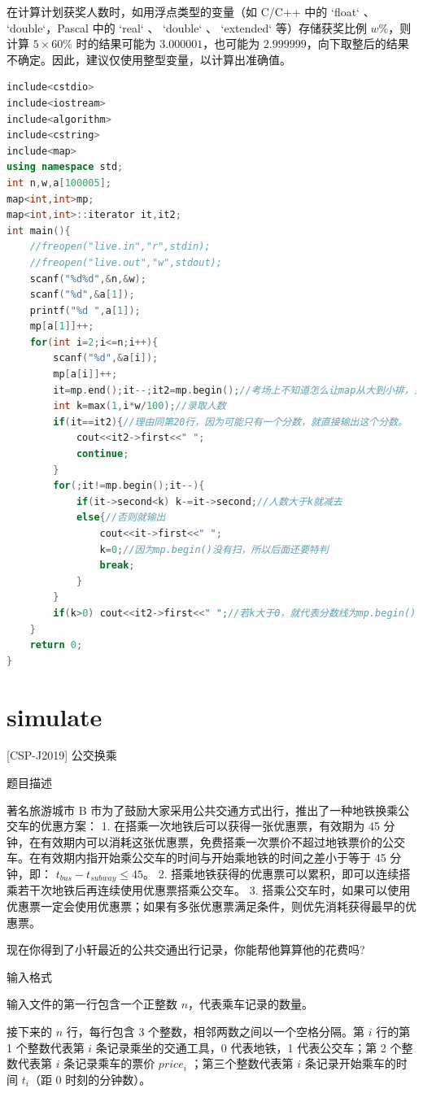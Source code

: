 \documentclass[12pt,twiside,a4paper]{ctexbook}
\numberwithin{chapter}{part}
\begin{document}
在计算计划获奖人数时，如用浮点类型的变量（如 C/C++ 中的 `float` 、 `double`，Pascal 中的 `real` 、 `double` 、 `extended` 等）存储获奖比例 $w\%$，则计算 $5 \times 60\%$ 时的结果可能为 $3.000001$，也可能为 $2.999999$，向下取整后的结果不确定。因此，建议仅使用整型变量，以计算出准确值。
\begin{lstlisting}[language=c++,breaklines=true]
include<cstdio>
include<iostream>
include<algorithm>
include<cstring>
include<map>
using namespace std;
int n,w,a[100005];
map<int,int>mp;
map<int,int>::iterator it,it2;
int main(){
	//freopen("live.in","r",stdin);
	//freopen("live.out","w",stdout);
	scanf("%d%d",&n,&w);
	scanf("%d",&a[1]);
	printf("%d ",a[1]);
	mp[a[1]]++;
	for(int i=2;i<=n;i++){
		scanf("%d",&a[i]);
		mp[a[i]]++;
		it=mp.end();it--;it2=mp.begin();//考场上不知道怎么让map从大到小排，只好麻烦些做了。 
		int k=max(1,i*w/100);//录取人数 
		if(it==it2){//理由同第20行，因为可能只有一个分数，就直接输出这个分数。 
			cout<<it2->first<<" ";
			continue;
		}
		for(;it!=mp.begin();it--){ 
			if(it->second<k) k-=it->second;//人数大于k就减去 
			else{//否则就输出 
				cout<<it->first<<" ";
				k=0;//因为mp.begin()没有扫，所以后面还要特判 
				break;
			}
		}
		if(k>0) cout<<it2->first<<" ";//若k大于0，就代表分数线为mp.begin(),输出 
	}
	return 0;
}
\end{lstlisting}

\chapter{simulate}
 [CSP-J2019] 公交换乘

 题目描述

著名旅游城市 B 市为了鼓励大家采用公共交通方式出行，推出了一种地铁换乘公交车的优惠方案：
1. 在搭乘一次地铁后可以获得一张优惠票，有效期为 45 分钟，在有效期内可以消耗这张优惠票，免费搭乘一次票价不超过地铁票价的公交车。在有效期内指开始乘公交车的时间与开始乘地铁的时间之差小于等于 45 分钟，即：
$t_{bus} - t_{subway} \leq 45$。
2. 搭乘地铁获得的优惠票可以累积，即可以连续搭乘若干次地铁后再连续使用优惠票搭乘公交车。
3. 搭乘公交车时，如果可以使用优惠票一定会使用优惠票；如果有多张优惠票满足条件，则优先消耗获得最早的优惠票。

现在你得到了小轩最近的公共交通出行记录，你能帮他算算他的花费吗?

 输入格式

输入文件的第一行包含一个正整数 $n$，代表乘车记录的数量。

接下来的 $n$ 行，每行包含 3 个整数，相邻两数之间以一个空格分隔。第 $i$ 行的第 1 个整数代表第 $i$ 条记录乘坐的交通工具，0 代表地铁，1 代表公交车；第 2 个整数代表第 $i$ 条记录乘车的票价 $price_i$ ；第三个整数代表第 $i$ 条记录开始乘车的时间 $t_i$（距 0 时刻的分钟数）。
\end{document}
